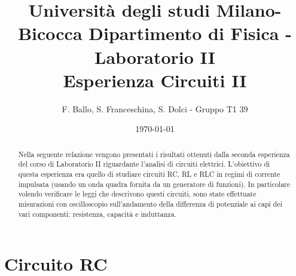 \documentclass[letterpaper,12pt]{article}
\begin{document}
\title{{\small Università degli studi Milano-Bicocca  Dipartimento di Fisica - Laboratorio II }\\
	Esperienza Circuiti II}
\author{F. Ballo, S. Franceschina, S. Dolci - Gruppo T1 39}
\date{\today}
\maketitle
\thispagestyle{logoheader}


\begin{abstract}
	Nella seguente relazione vengono presentati i risultati ottenuti dalla seconda esperienza del corso di Laboratorio II riguardante l'analisi di circuiti elettrici. L'obiettivo di questa esperienza era quello di studiare circuiti RC, RL e RLC in regimi di corrente impulsata (usando un onda quadra fornita da un generatore di funzioni). In particolare volendo verificare le leggi che descrivono questi circuiti, sono state effettuate misurazioni con oscilloscopio sull'andamento della differenza di potenziale ai capi dei vari componenti: resistenza, capacità e induttanza.

	\begin{adjustwidth}{-1cm}{-1cm}


	\end{adjustwidth}
\end{abstract}
\tableofcontents
\newpage

\section{Circuito RC}
\end{document}
